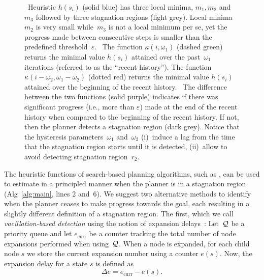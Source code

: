 \documentclass{article}
\begin{document}
\begin{figure}[t]
{	~Heuristic $h(s_i)$ (solid blue) has three local minima, $m_1, m_2$ and $m_3$ followed by three stagnation regions (light grey). Local minima $m_2$ is very small while~$m_3$ is not a local minimum per se, yet the progress made between consecutive steps is smaller than the predefined threshold~$\varepsilon$.
    ~The function $\kappa(i,\omega_1)$ (dashed green) returns the minimal value $h(s_i)$ attained over the past~$\omega_1$ iterations (referred to  as the ``recent history'').
    The function $\kappa(i-\omega_2,\omega_1-\omega_2)$ (dotted red) returns the minimal value $h(s_i)$ attained over the beginning of the recent history.
    ~The difference between the two functions (solid purple) indicates if there was significant progress (i.e., more than $\varepsilon$) made at the end of the recent history when compared to the beginning of the recent history. 
    If not, then the planner detects a stagnation region (dark grey).
		Notice that the hysteresis parameters~$\omega_1$ and~$\omega_2$ 
		(i)~induce a lag from the time that the stagnation region starts until it is detected,
		(ii)~allow to avoid detecting stagnation region~$r_2$.  
		}%

  \label{fig:filmstrip-local-min2}%

  \vspace{-2.5mm}

\end{figure}

The heuristic functions of search-based planning algorithms, such as \mhastar, can be used to estimate in a principled manner when the planner is in a stagnation region (Alg~\ref{alg:main}, lines 2 and~6). 
%
We suggest two alternative methods to identify when the planner ceases to make progress towards the goal, each resulting in a slightly different definition of a  stagnation region.
The first, which we call \emph{vacillation-based detection} using the notion of expansion delays~\cite{DTR11}:
Let~$\mathcal{Q}$ be a priority queue and let $e_\text{curr}$ be a counter tracking the total number of node expansions performed when using~$\mathcal{Q}$.
When a node is expanded, for each child node $s$ we store the current expansion number using a counter $e(s)$.
Now, the expansion delay for a state $s$ is defined as
$$
\Delta e = e_\text{curr} - e(s).
$$ 
\end{document}
